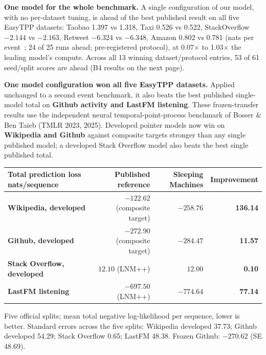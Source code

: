 \documentclass[10pt, a4 paper]{article}
\newcommand{\sect}[2]{\vspace{2pt}{\color{ours}\footnotesize\bfseries\MakeUppercase{#1}}\par\vspace{-3pt}{\LARGE\bfseries #2}\par\vspace{2pt}}
\newcommand{\up}{\,{\color{good}\faArrowUp}}
\newcommand{\down}{\,{\color{good}\faArrowDown}}
\begin{document}
\begin{tile}
\textbf{One model for the whole benchmark.} A single configuration of our model, with no per-dataset tuning, is ahead of the best published result on all five EasyTPP datasets: Taobao 1.397 vs 1.318, Taxi 0.526 vs 0.522, StackOverflow $-2.144$ vs $-2.163$, Retweet $-6.324$ vs $-6.348$, Amazon 0.802 vs 0.781 (nats per event \up; 24 of 25 runs ahead; pre-registered protocol), at 0.07$\times$ to 1.03$\times$ the leading model's compute. Across all 13 winning dataset/protocol entries, 53 of 61 seed/split scores are ahead (B4 results on the next page).
\end{tile}



\newpage
\sect{Beyond EasyTPP}{Four wins on a second event benchmark}

\textbf{One model configuration won all five EasyTPP datasets.} Applied unchanged to a second event benchmark, it also beats the best published single-model total on \textbf{Github activity and LastFM listening}. These frozen-transfer results use the independent neural temporal-point-process benchmark of Bosser \& Ben Taieb (TMLR 2023, 2025). Developed pointer models now win on \textbf{Wikipedia and Github} against composite targets stronger than any single published model; a developed Stack Overflow model also beats the best single published total.

\vspace{2mm}
{\small
\begin{tabularx}{\linewidth}{>{\bfseries}Y r r r}
\toprule
Total prediction loss {\color{muted}\footnotesize nats/sequence \down} & Published reference & Sleeping Machines & Improvement \\
\midrule
Wikipedia, developed & $-122.62$ (composite target) & \textbf{$-258.76$} & \textbf{136.14} \\
Github, developed & $-272.90$ (composite target) & \textbf{$-284.47$} & \textbf{11.57} \\
Stack Overflow, developed & $12.10$ (LNM++) & \textbf{$12.00$} & \textbf{0.10} \\
LastFM listening & $-697.50$ (LNM++) & \textbf{$-774.64$} & \textbf{77.14} \\
\bottomrule
\end{tabularx}}
{\footnotesize\color{muted}Five official splits; mean total negative log-likelihood per sequence, lower is better. Standard errors across the five splits: Wikipedia developed 37.73; Github developed 54.29; Stack Overflow 0.65; LastFM 48.38. Frozen Github: $-270.62$ (SE 48.69).}
\end{document}
